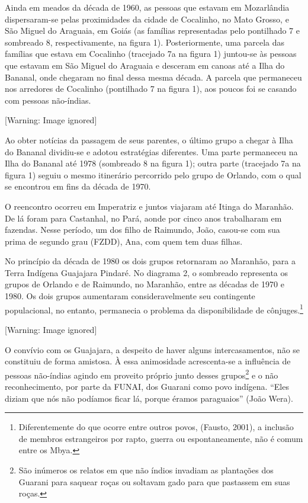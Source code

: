 \documentclass{article}
\begin{document}
Ainda em meados da d\'ecada de 1960, as pessoas que estavam em
Mozarl\^andia dispersaram-se pelas proximidades da cidade de Cocalinho,
no Mato Grosso, e S\~ao Miguel do Araguaia, em Goi\'as (as fam\'ilias
representadas pelo pontilhado 7 e sombreado 8, respectivamente, na
figura 1). Posteriormente, uma parcela das fam\'ilias que estava em
Cocalinho (tracejado 7a na figura 1) juntou-se \`as pessoas que estavam
em S\~ao Miguel do Araguaia e desceram em canoas at\'e a Ilha do
Bananal, onde chegaram no final dessa mesma d\'ecada. A parcela que
permaneceu nos arredores de Cocalinho (pontilhado 7 na figura 1), aos
poucos foi se casando com pessoas n\~ao-\'indias.  

  [Warning: Image ignored] %
 

Ao obter not\'icias da passagem de seus parentes, o \'ultimo grupo a
chegar \`a Ilha do Bananal dividiu-se e adotou estrat\'egias
diferentes. Uma parte permaneceu na Ilha do Bananal at\'e 1978
(sombreado 8 na figura 1); outra parte (tracejado 7a na figura 1)
seguiu o mesmo itiner\'ario percorrido pelo grupo de Orlando, com o
qual se encontrou em fins da d\'ecada de 1970.

O reencontro ocorreu em Imperatriz e juntos viajaram at\'e Itinga do
Maranh\~ao. De l\'a foram para Castanhal, no Par\'a, aonde por cinco
anos trabalharam em fazendas. Nesse per\'iodo, um dos filho de
Raimundo, Jo\~ao, casou-se com sua prima de segundo grau (FZDD), Ana,
com quem tem duas filhas.

No princ\'ipio da d\'ecada de 1980 os dois grupos retornaram ao
Maranh\~ao, para a Terra Ind\'igena Guajajara Pindar\'e. No diagrama 2,
o sombreado representa os grupos de Orlando e de Raimundo, no
Maranh\~ao, entre as d\'ecadas de 1970 e 1980. Os dois grupos
aumentaram consideravelmente seu contingente populacional, no entanto,
permanecia o problema da disponibilidade de c\^onjuges.\footnote{
Diferentemente do que ocorre entre outros povos, (Fausto, 2001), a
inclus\~ao de membros estrangeiros por rapto, guerra ou
espontaneamente, n\~ao \'e comum entre os Mbya.}

  [Warning: Image ignored] %
 

O conv\'ivio com os Guajajara, a despeito de haver alguns
intercasamentos, n\~ao se constituiu de forma amistosa. \`A essa
animosidade acrescenta-se a influ\^encia de pessoas n\~ao-\'indias
agindo em proveito pr\'oprio junto desses grupos\footnote{ S\~ao
in\'umeros os relatos em que n\~ao \'indios invadiam as
planta\c{c}\~oes dos Guarani para saquear ro\c{c}as ou soltavam gado
para que pastassem em suas ro\c{c}as.} e o n\~ao reconhecimento, por
parte da FUNAI, dos Guarani como povo ind\'igena.
{\textquotedblleft}Eles diziam que n\'os n\~ao pod\'iamos ficar l\'a,
porque \'eramos paraguaios{\textquotedblright} (Jo\~ao Wera). 
\end{document}
